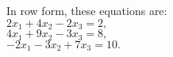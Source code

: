 \documentclass[preview]{standalone}
\begin{document}
\begin{center}
In row form, these equations are: \\$2x_1 + 4x_2 -2x_3 = 2,$ \\$4x_1 + 9x_2 -3x_3 = 8,$ \\$-2x_1 -3x_2 + 7x_3 = 10.$
\end{center}
\end{document}
